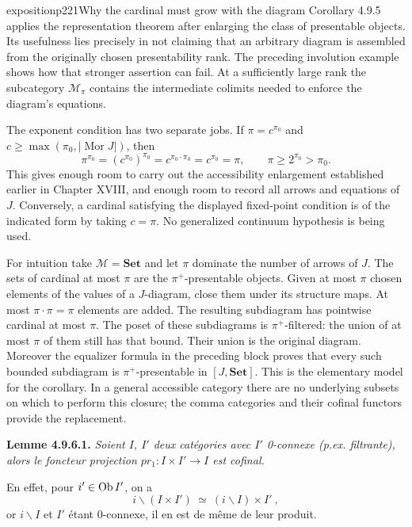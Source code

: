 \begin{dcomment}{exposition}{p221}{Why the cardinal must grow with the diagram}
Corollary 4.9.5 applies the representation theorem after enlarging the class of presentable objects.  Its usefulness lies precisely in not claiming that an arbitrary diagram is assembled from the originally chosen presentability rank.  The preceding involution example shows how that stronger assertion can fail.  At a sufficiently large rank the subcategory $\mathcal M_\pi$ contains the intermediate colimits needed to enforce the diagram's equations.

The exponent condition has two separate jobs.  If $\pi=c^{\pi_0}$ and $c\geq\max(\pi_0,|\operatorname{Mor}J|)$, then
\[
 \pi^{\pi_0}=(c^{\pi_0})^{\pi_0}
 =c^{\pi_0\cdot\pi_0}=c^{\pi_0}=\pi,
 \qquad \pi\geq 2^{\pi_0}>\pi_0.
\]
This gives enough room to carry out the accessibility enlargement established earlier in Chapter XVIII, and enough room to record all arrows and equations of $J$.  Conversely, a cardinal satisfying the displayed fixed-point condition is of the indicated form by taking $c=\pi$.  No generalized continuum hypothesis is being used.

For intuition take $\mathcal M=\mathbf{Set}$ and let $\pi$ dominate the number of arrows of $J$.  The sets of cardinal at most $\pi$ are the $\pi^+$-presentable objects.  Given at most $\pi$ chosen elements of the values of a $J$-diagram, close them under its structure maps.  At most $\pi\cdot\pi=\pi$ elements are added.  The resulting subdiagram has pointwise cardinal at most $\pi$.  The poset of these subdiagrams is $\pi^+$-filtered: the union of at most $\pi$ of them still has that bound.  Their union is the original diagram.  Moreover the equalizer formula in the preceding block proves that every such bounded subdiagram is $\pi^+$-presentable in $[J,\mathbf{Set}]$.  This is the elementary model for the corollary.  In a general accessible category there are no underlying subsets on which to perform this closure; the comma categories and their cofinal functors provide the replacement.
\end{dcomment}


\textbf{Lemme 4.9.6.1.} \textit{Soient $I$, $I'$ deux catégories avec $I'$ \textup{0}-connexe (p.ex. filtrante), alors le foncteur projection $pr_1 : I \times I' \longrightarrow I$ est cofinal.}

En effet, pour $i' \in \operatorname{Ob} I'$, on a
\[
i\backslash(I \times I') \ \simeq \ (i\backslash I) \times I' \ ,
\]
or $i\backslash I$ et $I'$ étant 0-connexe, il en est de même de leur produit.

